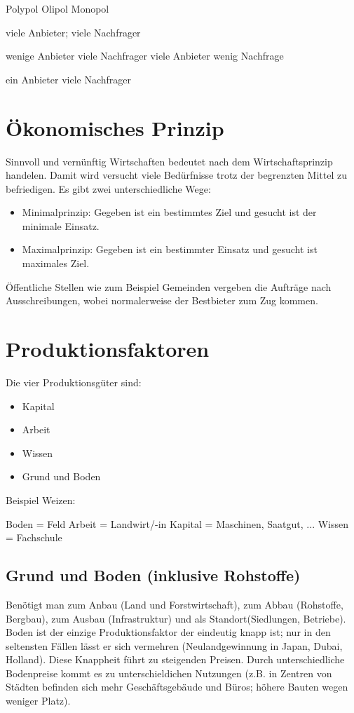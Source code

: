 \documentclass[a4paper]{report}
\begin{document}
Polypol  Olipol  Monopol


viele Anbieter; viele Nachfrager

wenige Anbieter 
viele Nachfrager
viele Anbieter
wenig Nachfrage

ein Anbieter
viele Nachfrager

\chapter{Ökonomisches Prinzip}
Sinnvoll und vernünftig Wirtschaften bedeutet nach dem Wirtschaftsprinzip handelen. Damit wird versucht viele Bedürfnisse trotz der begrenzten Mittel zu
befriedigen. Es gibt zwei unterschiedliche Wege:

	\begin{itemize}
	\item Minimalprinzip: Gegeben ist ein bestimmtes Ziel und gesucht ist der minimale Einsatz.
	\item Maximalprinzip: Gegeben ist ein bestimmter Einsatz und gesucht ist maximales Ziel.
	\end{itemize}
	
Öffentliche Stellen wie zum Beispiel Gemeinden vergeben die Aufträge nach Ausschreibungen, wobei normalerweise der Bestbieter zum Zug kommen.


\chapter{Produktionsfaktoren}

Die vier Produktionsgüter sind:

\begin{itemize}
\item Kapital
\item Arbeit 
\item Wissen
\item Grund und Boden
\end{itemize}

Beispiel Weizen:

Boden = Feld
Arbeit = Landwirt/-in
Kapital = Maschinen, Saatgut, ...
Wissen = Fachschule

\section{Grund und Boden (inklusive Rohstoffe)}

Benötigt man zum Anbau (Land und Forstwirtschaft), zum Abbau (Rohstoffe, Bergbau), zum Ausbau (Infrastruktur) und als Standort(Siedlungen, Betriebe).
Boden ist der einzige Produktionsfaktor der eindeutig knapp ist; nur in den seltensten Fällen lässt er sich vermehren (Neulandgewinnung in Japan, Dubai, Holland). Diese Knappheit führt zu steigenden Preisen. Durch unterschiedliche Bodenpreise kommt es zu unterschieldichen Nutzungen (z.B. in Zentren von Städten befinden sich mehr Geschäftsgebäude und Büros; höhere Bauten wegen weniger Platz). 
\end{document}
